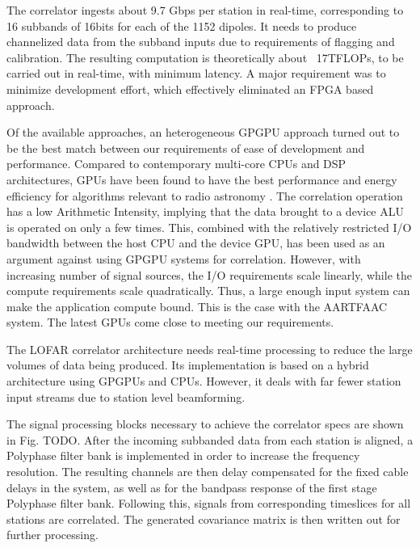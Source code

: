 \documentclass{ws-jai}
\begin{document}
The correlator ingests about 9.7 Gbps per station in real-time, corresponding to
16  subbands of  16bits for  each  of the  1152  dipoles.  It  needs to  produce
channelized data  from the subband  inputs due  to requirements of  flagging and
calibration. The resulting  computation is theoretically about  ~17TFLOPs, to be
carried out  in real-time,  with minimum  latency.  A  major requirement  was to
minimize  development  effort,  which   effectively  eliminated  an  FPGA  based
approach.

Of the  available approaches, an heterogeneous  GPGPU approach turned out  to be
the best match between our requirements  of ease of development and performance.
Compared to contemporary  multi-core CPUs and DSP architectures,  GPUs have been
found to have the best performance and energy efficiency for algorithms relevant
to radio astronomy \cite{romein2016comparison}.  The correlation operation has a
low Arithmetic  Intensity, implying  that the  data brought to  a device  ALU is
operated on only a few times.  This, combined with the relatively restricted I/O
bandwidth between the host CPU and the  device GPU, has been used as an argument
against using GPGPU systems for  correlation. However, with increasing number of
signal  sources,  the  I/O  requirements   scale  linearly,  while  the  compute
requirements scale quadratically. Thus, a large enough input system can make the
application compute bound. This is the case with the AARTFAAC system. The latest
GPUs come close to meeting our requirements.

The LOFAR correlator architecture needs real-time processing to reduce the large
volumes  of data  being  produced.   Its implementation  is  based  on a  hybrid
architecture using  GPGPUs and CPUs.  However,  it deals with far  fewer station
input streams due to station level beamforming.


The signal processing blocks necessary to achieve the correlator specs are shown
in Fig. TODO.  After the incoming subbanded data from each station is aligned, a
Polyphase  filter  bank  is  implemented  in order  to  increase  the  frequency
resolution.  The  resulting channels  are then delay  compensated for  the fixed
cable delays in  the system, as well  as for the bandpass response  of the first
stage  Polyphase  filter  bank.   Following  this,  signals  from  corresponding
timeslices for all  stations are correlated. The generated  covariance matrix is
then written out for further processing.
\end{document}
